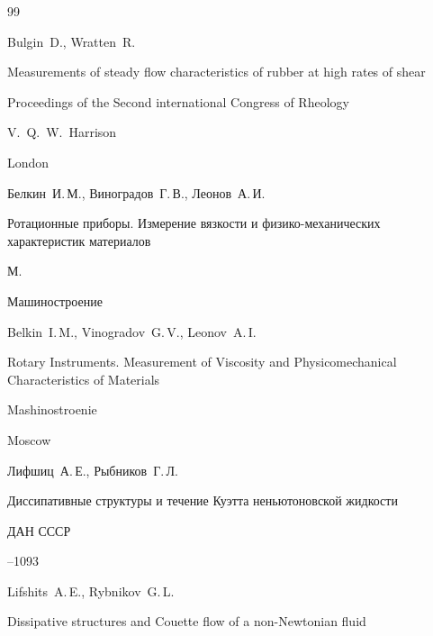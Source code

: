 \begin{thebibliography}{99}






\by Bulgin~D., Wratten~R.

\paper Measurements of steady flow characteristics of rubber at high rates of shear

\inbook Proceedings of the Second international Congress of Rheology

\ed V.~Q.~W.~Harrison

\publaddr London







\by Белкин~И.\,М., Виноградов~Г.\,В., Леонов~А.\,И. 

\book Ротационные приборы. Измерение вязкости и физико-механических характеристик материалов

\publaddr М. 

\publ Машиностроение



\misctransl

\by  Belkin~I.\,M., Vinogradov~G.\,V., Leonov~A.\,I.

\book Rotary Instruments. Measurement of Viscosity and Physicomechanical Characteristics of Materials

\publ  Mashinostroenie

\publaddr Moscow 






\by Лифшиц~А.\,Е., Рыбников~Г.\,Л.

\paper Диссипативные структуры и течение Куэтта неньютоновской жидкости

\jour ДАН СССР




--1093

\misctransl

\by Lifshits~A.\,E., Rybnikov~G.\,L. 

\paper Dissipative structures and Couette flow of a non-Newtonian fluid


\end{thebibliography}

